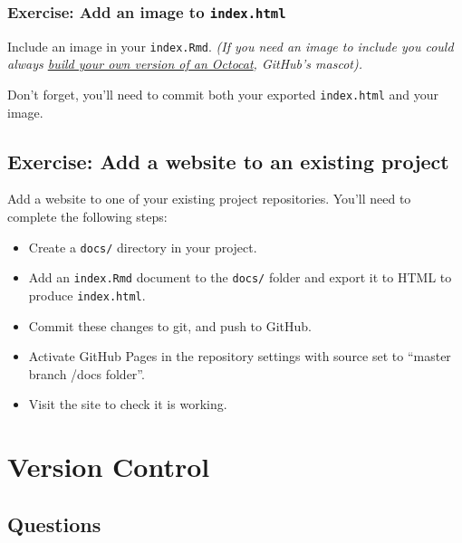 \documentclass[]{Nemilov}
\providecommand{\tightlist}{%
  \setlength{\itemsep}{0pt}\setlength{\parskip}{0pt}}
\begin{document}
\hypertarget{exercise-add-an-image-to-index.html}{%
\subsection{\texorpdfstring{Exercise: Add an image to \texttt{index.html}}{Exercise: Add an image to index.html}}\label{exercise-add-an-image-to-index.html}}

Include an image in your \texttt{index.Rmd}.
\emph{(If you need an image to include you could always \href{https://myoctocat.com}{build your own version of an Octocat},
GitHub's mascot).}

Don't forget, you'll need to commit both your exported \texttt{index.html} and your image.

\hypertarget{exercise-add-a-website-to-an-existing-project}{%
\section{Exercise: Add a website to an existing project}\label{exercise-add-a-website-to-an-existing-project}}

Add a website to one of your existing project repositories.
You'll need to complete the following steps:

\begin{itemize}
\tightlist
\item
  Create a \texttt{docs/} directory in your project.
\item
  Add an \texttt{index.Rmd} document to the \texttt{docs/} folder
  and export it to HTML to produce \texttt{index.html}.
\item
  Commit these changes to git, and push to GitHub.
\item
  Activate GitHub Pages in the repository settings with source set to ``master branch /docs folder''.
\item
  Visit the site to check it is working.
\end{itemize}

\hypertarget{py-version-control}{%
\chapter{Version Control}\label{py-version-control}}

\hypertarget{py-version-control-questions}{%
\section{Questions}\label{py-version-control-questions}}
\end{document}
